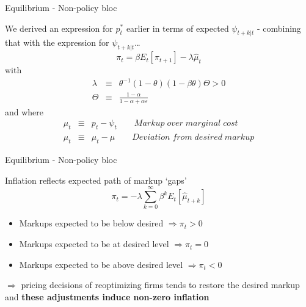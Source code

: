 \documentclass{beamer}
\begin{document}

	
\begin{frame}{Equilibrium - Non-policy bloc}

We derived an expression for $p_{t}^{\ast}$ earlier in terms of expected $\psi_{t+k|t}$ - combining that with the expression for $\psi_{t+k|t}$\ldots 
\[
\pi_{t} 			=	\beta E_{t}[ \pi_{t+1} ]	 -\lambda \hat{\mu}_{t}
\]
with
\begin{eqnarray*}
\lambda 			&\equiv& 	\theta^{-1}(1-\theta)(1-\beta\theta)\Theta > 0\\
\Theta 			&\equiv& 	\frac{1-\alpha}{1-\alpha + \alpha \varepsilon}
\end{eqnarray*}
and where
\begin{eqnarray*}
\mu_{t} 		&\equiv&	 p_{t} - \psi_{t} \qquad \!\!Markup\;over\;marginal\;cost\\
\hat{\mu}_{t} 	&\equiv&	 \mu_{t} - \mu \qquad Deviation\;from\;desired\;markup
\end{eqnarray*}

\end{frame}


	
\begin{frame}{Equilibrium - Non-policy bloc}

Inflation reflects expected path of markup `gaps'
\[
\pi_{t} = -\lambda \sum\limits_{k=0}^{\infty} \beta^{k} E_{t}[\hat{\mu}_{t+k}]
\]

\begin{itemize}
\item	Markups expected to be below desired $\Rightarrow \pi_{t}>0$
\item	Markups expected to be at desired level $\Rightarrow \pi_{t}=0$
\item	Markups expected to be above desired level $\Rightarrow \pi_{t}<0$
\end{itemize}

\vspace{3mm}
$\Rightarrow$ pricing decisions of reoptimizing firms tends to restore the desired markup and \textbf{these adjustments induce non-zero inflation}

\end{frame}
\end{document}

